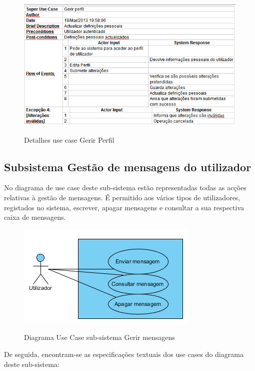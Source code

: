 ﻿\documentclass[12pt,a4paper]{article}
\begin{document}
\begin{figure}[h!]
\centering
\includegraphics[scale=0.7]{d_usecase/gerirperfil}
\label{usecase}
\caption{Detalhes use case Gerir Perfil}
\end{figure}

\newpage
\subsection{Subsistema Gestão de mensagens do utilizador}
No diagrama de use case deste sub-sistema estão representadas todas as acções relativas à gestão de mensagens. É permitido aos vários tipos de utilizadores, registados no sistema, escrever, apagar mensagens e consultar a sua respectiva caixa de mensagens.\\

\begin{figure}[h!]
\centering
\includegraphics[scale=1]{usecase/U_GerirMensagens}
\label{usecase}
\caption{Diagrama Use Case sub-sistema Gerir mensagens}
\end{figure}

De seguida, encontram-se as especificações textuais dos use cases do diagrama deste sub-sistema:\\
\end{document}
